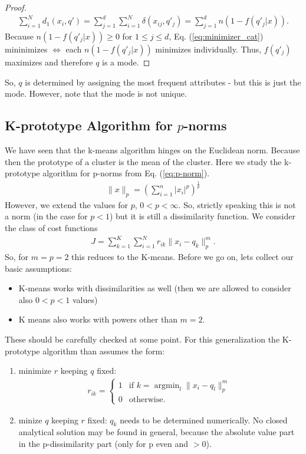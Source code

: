 \documentclass[10pt,a4paper]{article}
\begin{document}
\begin{proof}
\begin{align*}
\sum_{i=1} ^ N   d_1(x_i, q') = \sum_{j=1} ^ d  \sum_{i=1} ^ N   \delta(x_{ij}, q'_{j}) = \sum_{j=1} ^ d n (1 -f(q'_{j} |x) ). 
\end{align*}
Because $n(1 -f(q'_{j} |x)) \geq 0 $ for $1\leq j \leq  d$, Eq. (\ref{eq:minimizer_cat}) mininimizes $\Leftrightarrow$ each $n(1 -f(q'_{j} |x))$ minimizes individually. Thus,  $f(q'_{j})$ maximizes and therefore $q$ is a mode.
\end{proof}
So, $q$ is determined by assigning the most frequent attributes - but this is just the mode.  However, note that the mode is not unique. 

\subsection{K-prototype Algorithm for $p$-norms}
We have seen that the k-means algorithm hinges on the Euclidean norm. Because then the prototype of a cluster is the mean of the cluster. Here we study the k-prototype algorithm for p-norms from Eq. (\ref{eq:p-norm}).
\begin{align*}
\lVert x \rVert_p = \left(\sum_{i=1}^n \lvert x_i \rvert ^p \right)^{\frac{1}{p}}
\end{align*}
However, we extend the values for $p$, $0<p<\infty$. So, strictly speaking
this is not a norm (in the case for $p<1$) but it is still a dissimilarity function.
We consider the class of cost functions
\begin{align} 
J = \sum _{k=1}^K \sum_{i=1} ^ N  r_{ik} \rVert x_i -  q_k\rVert_p^m.
\end{align} 
So, for $m=p=2$ this reduces to the K-means. Before we go on, lets collect our basic assumptions:
\begin{itemize}
\item  K-means works with dissimilarities as well (then we are allowed to consider also $0<p<1$ values)
\item K means also works with powers other than $m=2$.
\end{itemize}
These should be carefully checked at some point.
For this generalization the K-prototype algorithm than assumes the form:

\begin{enumerate}
\item minimize $r$ keeping $q$ fixed:
\begin{align}
r_{ik} = \begin{cases}
1 & \text{if } k = \operatorname{argmin}_l \rVert x_i -  q_l\rVert_p^m  \\
0 & \text{otherwise}.
\end{cases}
\end{align}
\item minize $q$ keeping $r$ fixed:
$q_k$ needs to be determined numerically. No closed analytical solution may be found in general, because the absolute value part in the p-dissimilarity part (only for p even and $> 0$).

\end{enumerate}
\end{document}
